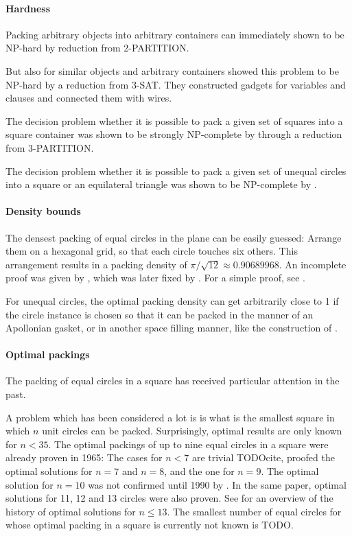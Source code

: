 \paragraph{Hardness}

Packing arbitrary objects into arbitrary containers can immediately shown to be NP-hard by reduction from \textsc{2-PARTITION}.

But also for similar objects and arbitrary containers \textcite{FPT1981optimal} showed this problem to be NP-hard by a reduction from \textsc{3-SAT}. They constructed gadgets for variables and clauses and connected them with wires.

The decision problem whether it is possible to pack a given set of squares into a square container was shown to be strongly NP-complete by \textcite{LTWYC1990packing} through a reduction from \textsc{3-PARTITION}.

The decision problem whether it is possible to pack a given set of unequal circles into a square or an equilateral triangle was shown to be NP-complete by \textcite{DFL2010circle}.

\paragraph{Density bounds}

The densest packing of equal circles in the plane can be easily guessed: Arrange them on a hexagonal grid, so that each circle touches six others. This arrangement results in a packing density of $\pi/\sqrt{12} \approx 0.90689968$. An incomplete proof was given by \textcite{thue1892om}, which was later fixed by \textcite{fejestoth1940uber}. For a simple proof, see \cite{CW2010simple}.

For unequal circles, the optimal packing density can get arbitrarily close to 1 if the circle instance is chosen so that it can be packed in the manner of an Apollonian gasket, or in another space filling manner, like the construction of \textcite{bourke2011random}.

\paragraph{Optimal packings}

The packing of equal circles in a square has received particular attention in the past.

A problem which has been considered a lot is is what is the smallest square in which $n$ unit circles can be packed. Surprisingly, optimal results are only known for $n < 35$.
The optimal packings of up to nine equal circles in a square were already proven in 1965: The cases for $n < 7$ are trivial TODOcite,
\textcite{schaer1965densest} proofed the optimal solutions for $n = 7$ and $n = 8$, and \textcite{SM1965geometric} the one for $n = 9$.
The optimal solution for $n = 10$ was not confirmed until 1990 by \textcite{DPW1990optimal}. In the same paper, optimal solutions for 11, 12 and 13 circles were also proven.
See \textcite{WMP1994history} for an overview of the history of optimal solutions for $n \le 13$.
The smallest number of equal circles for whose optimal packing in a square is currently not known is TODO.

